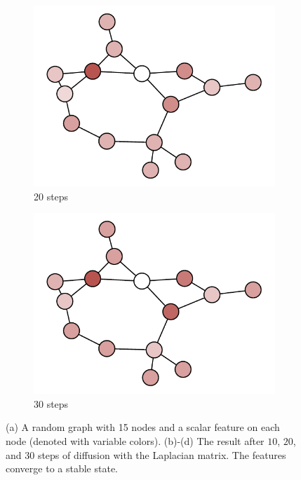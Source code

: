 \begin{figure}[t]
\begin{subfigure}[b]{0.24\textwidth}
    \includegraphics[width=\textwidth]{images/graph_diffusion_20}
    \caption{20 steps}
    \end{subfigure}
    \begin{subfigure}[b]{0.24\textwidth}
    \includegraphics[width=\textwidth]{images/graph_diffusion_30}
    \caption{30 steps}
    \end{subfigure}
    \caption{(a) A random graph with 15 nodes and a scalar feature on each node (denoted with variable colors). (b)-(d) The result after $10$, $20$, and $30$ steps of diffusion with the Laplacian matrix. The features converge to a stable state.}
    \label{fig:diffusion}
\end{figure}

